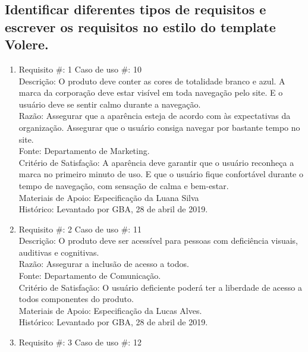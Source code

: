 \documentclass[12pt]{article}
\begin{document}
        \subsection{Identificar diferentes tipos de requisitos e escrever os requisitos no estilo do template Volere.}
            \begin{enumerate}
                \item Requisito \#:  1 Caso de uso \#: 10\\
                    Descrição: O produto deve conter as cores de totalidade branco e azul. A marca da corporação deve estar visível em toda navegação pelo site. E o usuário deve se sentir calmo durante a navegação.\\
                    Razão: Assegurar que a aparência esteja de acordo com às expectativas da organização. Assegurar que o usuário consiga navegar por bastante tempo no site. \\
                    Fonte: Departamento de Marketing.\\
                    Critério de Satisfação: A aparência deve garantir que o usuário reconheça a marca no primeiro minuto de uso. E que o usuário fique confortável durante o tempo de navegação, com sensação de calma e bem-estar. \\
                    Materiais de Apoio: Especificação da Luana Silva\\
                    Histórico: Levantado por GBA, 28 de abril de 2019.\\ 
                \item Requisito \#: 2 Caso de uso \#: 11\\
                    Descrição: O produto deve ser acessível para pessoas com deficiência visuais, auditivas e cognitivas.  \\
                    Razão: Assegurar a inclusão de acesso a todos. \\
                    Fonte: Departamento de Comunicação.\\
                    Critério de Satisfação: O usuário deficiente poderá ter a liberdade de acesso a todos componentes do produto. \\
                    Materiais de Apoio: Especificação da Lucas Alves.\\
                    Histórico: Levantado por GBA, 28 de abril de 2019. \\
                \item Requisito \#: 3 Caso de uso \#: 12\\

\end{enumerate}
\end{document}
